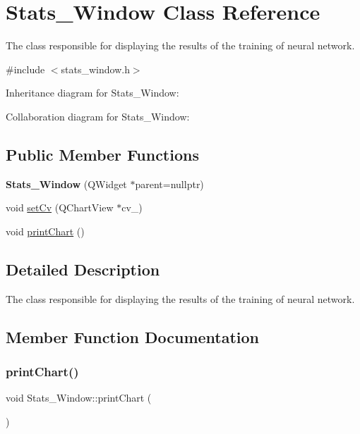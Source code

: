 \hypertarget{classStats__Window}{}\section{Stats\+\_\+\+Window Class Reference}
\label{classStats__Window}


The class responsible for displaying the results of the training of neural network.  




{\ttfamily \#include $<$stats\+\_\+window.\+h$>$}



Inheritance diagram for Stats\+\_\+\+Window\+:


Collaboration diagram for Stats\+\_\+\+Window\+:
\subsection*{Public Member Functions}
\begin{DoxyCompactItemize}
\item 
\mbox{\label{classStats__Window_a49651757f1c1248f77379112365e8e25}} 
{\bfseries Stats\+\_\+\+Window} (Q\+Widget $\ast$parent=nullptr)
\item 
void \hyperlink{classStats__Window_aa08614ebaf747b305a39bb790d2a96bd}{set\+Cv} (Q\+Chart\+View $\ast$cv\+\_\+)
\item 
void \hyperlink{classStats__Window_a1bdd2d19e64d9c316754e3f667ebbecb}{print\+Chart} ()
\end{DoxyCompactItemize}


\subsection{Detailed Description}
The class responsible for displaying the results of the training of neural network. 



\subsection{Member Function Documentation}
\mbox{\label{classStats__Window_a1bdd2d19e64d9c316754e3f667ebbecb}} 
\subsubsection{\texorpdfstring{print\+Chart()}{printChart()}}
{\footnotesize\ttfamily void Stats\+\_\+\+Window\+::print\+Chart (\begin{DoxyParamCaption}{ }\end{DoxyParamCaption})}

